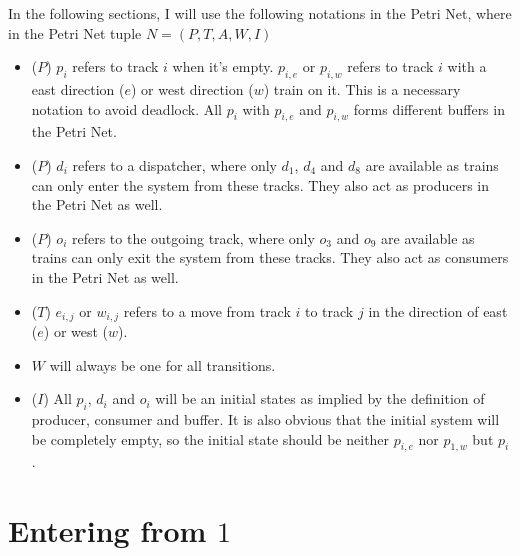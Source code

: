 \documentclass[12pt]{article}
\begin{document}
\begin{itemize}
\end{itemize}

In the following sections, I will use the following notations in the Petri Net, where in the Petri Net tuple $N=\left(P,T,A,W,I\right)$

\begin{itemize}
  \item ($P$) $p_i$ refers to track $i$ when it's empty. $p_{i,e}$ or $p_{i,w}$ refers to track $i$ with a east direction ($e$) or west direction ($w$) train on it. This is a necessary notation to avoid deadlock.  All $p_i$ with $p_{i,e}$ and $p_{i,w}$ forms different buffers in the Petri Net.
  \item ($P$) $d_i$ refers to a dispatcher, where only $d_1$, $d_4$ and $d_8$ are available as trains can only enter the system from these tracks. They also act as producers in the Petri Net as well.
  \item ($P$) $o_i$ refers to the outgoing track, where only $o_3$ and $o_9$ are available as trains can only exit the system from these tracks. They also act as consumers in the Petri Net as well.
  \item ($T$) $e_{i,j}$ or $w_{i,j}$ refers to a move from track $i$ to track $j$ in the direction of east ($e$) or west ($w$).
  \item $W$ will always be one for all transitions.
  \item ($I$) All $p_i$, $d_i$ and $o_i$ will be an initial states as implied by the definition of producer, consumer and buffer. It is also obvious that the initial system will be completely empty, so the initial state should be neither $p_{i,e}$ nor $p_{1,w}$ but $p_i$.
\end{itemize}

\section{Entering from $1$}
\end{document}
